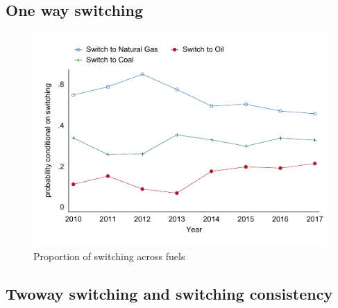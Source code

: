 \documentclass[12pt,notitlepage]{article}
\begin{document}
\pagebreak


\subsection{One way switching}

\begin{figure}[!htpb]
\centering
\includegraphics[scale=0.8	]{../Output/Graphs/Switch_year.pdf}
\caption{Proportion of switching across fuels}
\end{figure}


\subsection{Twoway switching and switching consistency}
\end{document}
